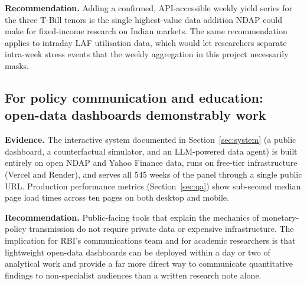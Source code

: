 \textbf{Recommendation.} Adding a confirmed, API-accessible weekly
yield series for the three T-Bill tenors is the single highest-value
data addition NDAP could make for fixed-income research on Indian
markets. The same recommendation applies to intraday LAF utilisation
data, which would let researchers separate intra-week stress events
that the weekly aggregation in this project necessarily masks.

\subsection{For policy communication and education: open-data
dashboards demonstrably work}

\textbf{Evidence.} The interactive system documented in
Section~\ref{sec:system} (a public dashboard, a counterfactual
simulator, and an LLM-powered data agent) is built entirely on open
NDAP and Yahoo Finance data, runs on free-tier infrastructure
(Vercel and Render), and serves all 545 weeks of the panel through a
single public URL. Production performance metrics
(Section~\ref{sec:qa}) show sub-second median page load times across
ten pages on both desktop and mobile.

\textbf{Recommendation.} Public-facing tools that explain the
mechanics of monetary-policy transmission do not require private data
or expensive infrastructure. The implication for RBI's communications
team and for academic researchers is that lightweight open-data
dashboards can be deployed within a day or two of analytical work and
provide a far more direct way to communicate quantitative findings to
non-specialist audiences than a written research note alone.
